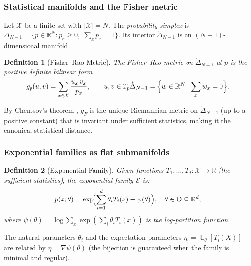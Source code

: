 \documentclass[referee,lineno,pdflatex,sn-mathphys-num]{sn-jnl}
\theoremstyle{thmstylethree}
\newtheorem{definition}{Definition}[section]
\theoremstyle{thmstyletwo}
\theoremstyle{thmstyleone}
\newcommand{\R}{\mathbb{R}}
\DeclareMathOperator{\Esym}{\mathbb{E}}
\begin{document}
\subsubsection{Statistical manifolds and the Fisher metric}

Let $\mathcal{X}$ be a finite set with $|\mathcal{X}|=N$.
The \emph{probability simplex} is
$\Delta_{N-1} = \{p\in\R^N : p_x\geq 0,\; \sum_x p_x = 1\}$.
Its interior $\mathring{\Delta}_{N-1}$ is an $(N-1)$-dimensional manifold.

\begin{definition}[Fisher--Rao Metric]\label{def:fisher-rao}
The \emph{Fisher--Rao metric} on $\mathring{\Delta}_{N-1}$ at $p$ is the positive
definite bilinear form
\begin{equation}\label{eq:fisher-rao}
  g_p(u,v) = \sum_{x\in\mathcal{X}} \frac{u_x\,v_x}{p_x},
  \qquad u,v\in T_p\mathring{\Delta}_{N-1} = \Bigl\{w\in\R^N : \sum_x w_x = 0\Bigr\}.
\end{equation}
\end{definition}

By Chentsov's theorem \cite{chentsov1982statistical}, $g_F$ is the unique
Riemannian metric on $\mathring{\Delta}_{N-1}$ (up to a positive constant) that is
invariant under sufficient statistics, making it the canonical statistical
distance.

\subsubsection{Exponential families as flat submanifolds}

\begin{definition}[Exponential Family]\label{def:exp-family}
Given functions $T_1,\ldots,T_d : \mathcal{X}\to\R$ (the \emph{sufficient statistics}),
the \emph{exponential family} $\mathcal{E}$ is:
\begin{equation}\label{eq:exp-family}
  p(x;\theta) = \exp\!\Bigl(\sum_{i=1}^d \theta_i T_i(x) - \psi(\theta)\Bigr),
  \quad \theta\in\Theta\subseteq\R^d,
\end{equation}
where $\psi(\theta)=\log\sum_x\exp(\sum_i\theta_i T_i(x))$ is the log-partition
function.
\end{definition}

The natural parameters $\theta_i$ and the expectation parameters
$\eta_i = \Esym_\theta[T_i(X)]$ are related by $\eta = \nabla\psi(\theta)$
(the bijection is guaranteed when the family is minimal and regular).
\end{document}
